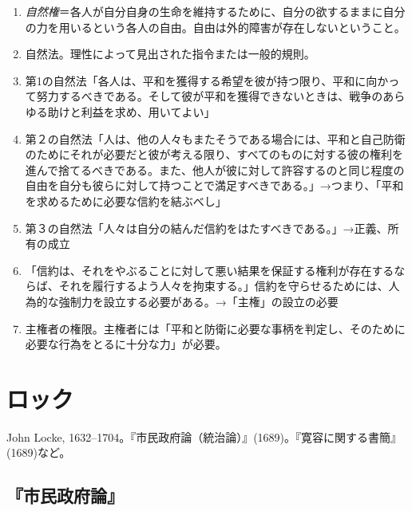 \documentclass[uplatex,dvipdfmx]{jsarticle} \usepackage{mystyle}%
\begin{document}
\begin{enumerate}
    \item \emph{自然権}＝各人が自分自身の生命を維持するために、自分の欲するままに自分の力を用いるという各人の自由。自由は外的障害が存在しないということ。

    \item 自然法。理性によって見出された指令または一般的規則。


    \item 第1の自然法「各人は、平和を獲得する希望を彼が持つ限り、平和に向かって努力するべきである。そして彼が平和を獲得できないときは、戦争のあらゆる助けと利益を求め、用いてよい」

    \item 第２の自然法「人は、他の人々もまたそうである場合には、平和と自己防衛のためにそれが必要だと彼が考える限り、すべてのものに対する彼の権利を進んで捨てるべきである。また、他人が彼に対して許容するのと同じ程度の自由を自分も彼らに対して持つことで満足すべきである。」→つまり、「平和を求めるために必要な信約を結ぶべし」

    \item 第３の自然法「人々は自分の結んだ信約をはたすべきである。」→正義、所有の成立


    \item 「信約は、それをやぶることに対して悪い結果を保証する権利が存在するならば、それを履行するよう人々を拘束する。」信約を守らせるためには、人為的な強制力を設立する必要がある。→「主権」の設立の必要

    \item 主権者の権限。主権者には「平和と防衛に必要な事柄を判定し、そのために必要な行為をとるに十分な力」が必要。
    
    \end{enumerate}



\section{ロック}


John Locke, 1632--1704。『市民政府論（統治論）』(1689)。『寛容に関する書簡』(1689)など。



\subsection{『市民政府論』}
\end{document}
